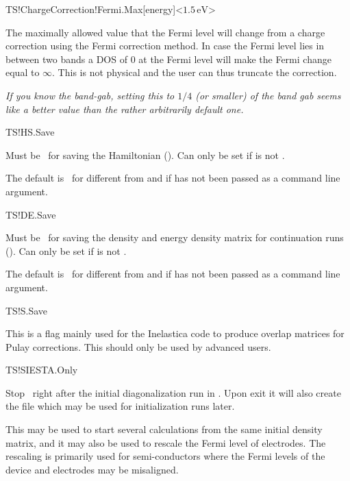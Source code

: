 \begin{fdfentry}{TS!ChargeCorrection!Fermi.Max}[energy]<$1.5\,\mathrm{eV}$>%

  The maximally allowed value that the Fermi level will change from a
  charge correction using the Fermi correction method. In case the
  Fermi level lies in between two bands a DOS of $0$ at the Fermi
  level will make the Fermi change equal to $\infty$. This is not
  physical and the user can thus truncate the correction.
  
  \emph{If you know the band-gab, setting this to $1/4$ (or smaller)
      of the band gab seems like a better value than the rather
      arbitrarily default one.}

\end{fdfentry}

\begin{fdflogicalT}{TS!HS.Save}

  Must be \fdftrue\ for saving the Hamiltonian (). Can only be set if
   is not .

  The default is \fdffalse\ for  different from
   and if  has not been passed as a
  command line argument.

\end{fdflogicalT}  

\begin{fdflogicalT}{TS!DE.Save}

  Must be \fdftrue\ for saving the density and energy density matrix
  for continuation runs (). Can only be set if
   is not .

  The default is \fdffalse\ for  different from
   and if  has not been passed as a
  command line argument.

\end{fdflogicalT}  

\begin{fdflogicalF}{TS!S.Save}

  This is a flag mainly used for the Inelastica code to produce
  overlap matrices for Pulay corrections. This should only be used by
  advanced users.

\end{fdflogicalF}


\begin{fdflogicalF}{TS!SIESTA.Only}

  Stop \tsiesta\ right after the initial diagonalization run in
  \siesta. Upon exit it will also create the  file which
  may be used for initialization runs later.

  This may be used to start several calculations from the same initial
  density matrix, and it may also be used to rescale the Fermi level
  of electrodes. The rescaling is primarily used for semi-conductors
  where the Fermi levels of the device and electrodes may be
  misaligned. 

\end{fdflogicalF}


